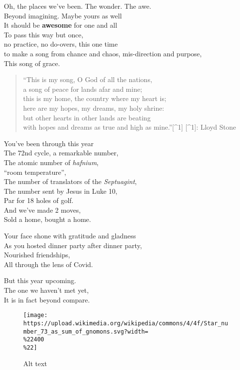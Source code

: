 \documentclass[
]{book}
\author{}
\date{}
\begin{document}
\frontmatter

\mainmatter
Oh, the places we've been. The wonder. The awe.\\
Beyond imagining. Maybe yours as well\\
It should be \textbf{awesome} for one and all\\
To pass this way but once,\\
no practice, no do-overs, this one time\\
to make a song from chance and chaos, mis-direction and purpose,\\
This song of grace.

\begin{quote}
``This is my song, O God of all the nations,\\
a song of peace for lands afar and mine;\\
this is my home, the country where my heart is;\\
here are my hopes, my dreams, my holy shrine:\\
but other hearts in other lands are beating\\
with hopes and dreams as true and high as mine.''{[}\^{}1{]} {[}\^{}1{]}: Lloyd Stone
\end{quote}

You've been through this year\\
The 72nd cycle, a remarkable number,\\
The atomic number of \emph{hafnium},\\
``room temperature'',\\
The number of translators of the \emph{Septuagint},\\
The number sent by Jesus in Luke 10,\\
Par for 18 holes of golf.\\
And we've made 2 moves,\\
Sold a home, bought a home.

Your face shone with gratitude and gladness\\
As you hosted dinner party after dinner party,\\
Nourished friendships,\\
All through the lens of Covid.

But this year upcoming.\\
The one we haven't met yet,\\
It is in fact beyond compare.

\begin{figure}
\centering
\texttt{[image: https://upload.wikimedia.org/wikipedia/commons/4/4f/Star\_number\_73\_as\_sum\_of\_gnomons.svg?width=\\\%22400\\\%22]}
\caption{Alt text}
\end{figure}
\end{document}
